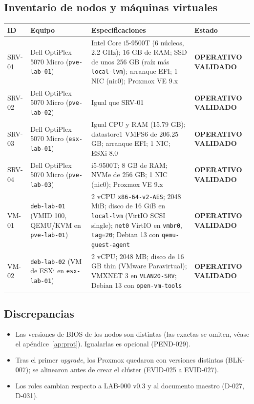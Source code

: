 \documentclass[11pt,a4paper]{article}
\newcommand{\estado}[1]{%
  \ifstrequal{#1}{COMPLETADA}{\textcolor{okgreen}{\textbf{\footnotesize #1}}}{%
  \ifstrequal{#1}{OPERATIVO VALIDADO}{\textcolor{okgreen}{\textbf{\footnotesize #1}}}{%
  \ifstrequal{#1}{OK}{\textcolor{okgreen}{\textbf{\footnotesize #1}}}{%
  \ifstrequal{#1}{RESUELTO}{\textcolor{okgreen}{\textbf{\footnotesize #1}}}{%
  \ifstrequal{#1}{EN CURSO}{\textcolor{amber}{\textbf{\footnotesize #1}}}{%
  \ifstrequal{#1}{REPORTADO}{\textcolor{amber}{\textbf{\footnotesize #1}}}{%
  \ifstrequal{#1}{NO EJECUTADA}{\textcolor{muted}{\textbf{\footnotesize #1}}}{%
  \ifstrequal{#1}{PROPUESTO}{\textcolor{violet}{\textbf{\footnotesize #1}}}{%
  \ifstrequal{#1}{PENDIENTE}{\textcolor{alertred}{\textbf{\footnotesize #1}}}{%
  \ifstrequal{#1}{FALLIDA}{\textcolor{alertred}{\textbf{\footnotesize #1}}}{%
  \textbf{\footnotesize #1}}}}}}}}}}}}
\newcommand{\cab}{\rowcolor{light}}
\begin{document}
\subsection{Inventario de nodos y máquinas virtuales}
{\small
\begin{longtable}{L{1.5cm} L{3.4cm} L{6.6cm} L{3.0cm}}
  \toprule
  \cab\textbf{ID} & \textbf{Equipo} & \textbf{Especificaciones} & \textbf{Estado}\\
  \midrule
  \endhead
  SRV-01 & Dell OptiPlex 5070 Micro (\texttt{pve-lab-01}) & Intel Core i5-9500T (6 núcleos, 2.2 GHz); 16 GB de RAM; SSD de unos 256 GB (raíz más \texttt{local-lvm}); arranque EFI; 1 NIC (nic0); Proxmox VE 9.x & \estado{OPERATIVO VALIDADO}\\
  SRV-02 & Dell OptiPlex 5070 Micro (\texttt{pve-lab-02}) & Igual que SRV-01 & \estado{OPERATIVO VALIDADO}\\
  SRV-03 & Dell OptiPlex 5070 Micro (\texttt{esx-lab-01}) & Igual CPU y RAM (15.79 GB); datastore1 VMFS6 de 206.25 GB; arranque EFI; 1 NIC; ESXi 8.0 & \estado{OPERATIVO VALIDADO}\\
  SRV-04 & Dell OptiPlex 5070 Micro (\texttt{pve-lab-03}) & i5-9500T; 8 GB de RAM; NVMe de 256 GB; 1 NIC (nic0); Proxmox VE 9.x & \estado{OPERATIVO VALIDADO}\\
  VM-01 & \texttt{deb-lab-01} (VMID 100, QEMU/KVM en \texttt{pve-lab-01}) & 2 vCPU \texttt{x86-64-v2-AES}; 2048 MiB; disco de 16 GiB en \texttt{local-lvm} (VirtIO SCSI single); \texttt{net0} VirtIO en \texttt{vmbr0}, \texttt{tag=20}; Debian 13 con \texttt{qemu-guest-agent} & \estado{OPERATIVO VALIDADO}\\
  VM-02 & \texttt{deb-lab-02} (VM de ESXi en \texttt{esx-lab-01}) & 2 vCPU; 2048 MB; disco de 16 GB thin (VMware Paravirtual); VMXNET 3 en \texttt{VLAN20-SRV}; Debian 13 con \texttt{open-vm-tools} & \estado{OPERATIVO VALIDADO}\\
  \bottomrule
\end{longtable}
}

\subsection{Discrepancias}
\begin{itemize}
  \item Las versiones de BIOS de los nodos son distintas (las exactas se omiten, véase el apéndice~\ref{ap:prot}). Igualarlas es opcional (PEND-029).
  \item Tras el primer \emph{upgrade}, los Proxmox quedaron con versiones distintas (BLK-007); se alinearon antes de crear el clúster (EVID-025 a EVID-027).
  \item Los roles cambian respecto a LAB-000 v0.3 y al documento maestro (D-027, D-031).
\end{itemize}
\end{document}
